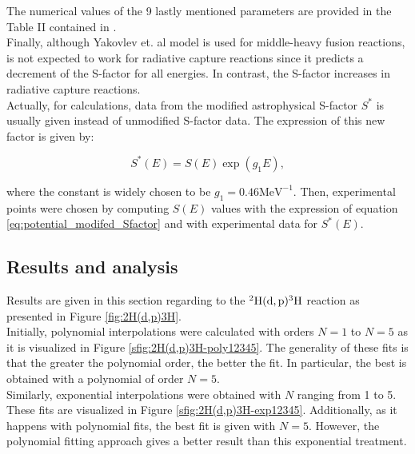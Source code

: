 \documentclass[openany]{book}
\begin{document}
The numerical values of the 9 lastly mentioned parameters are provided in the Table II contained in \cite{yakovlev_beard_gasques_wiescher_2010}. \\

Finally, although Yakovlev et. al model is used for middle-heavy fusion reactions, is not expected to work for radiative capture reactions since it predicts a decrement of the S-factor for all energies. In contrast, the S-factor increases in radiative capture reactions.  \\

Actually, for calculations, data from the modified astrophysical S-factor $S^{*}$ is usually given instead of unmodified S-factor data. The expression of this new factor is given by:

\begin{equation}\label{eq:potential_modifed_Sfactor}
	S^{*}(E) = S(E) \exp {(g_1E)},
\end{equation}

where the constant is widely chosen to be $g_1 = 0.46 \mathrm{MeV^{-1}}$. Then, experimental points were chosen by computing $S(E)$ values with the expression of equation \ref{eq:potential_modifed_Sfactor} and with experimental data for $S^{*}(E)$.


\subsection{Results and analysis} \label{sub:resultsAnalysisNonResonant}

Results are given in this section regarding to the $\mathrm{{}^{2}H(d, p){}^{3}H}$ reaction as presented in Figure \ref{fig:2H(d,p)3H}. \\ 

Initially, polynomial interpolations were calculated with orders $N = 1$ to $N = 5$ as it is visualized in Figure \ref{sfig:2H(d,p)3H-poly12345}. The generality of these fits is that the greater the polynomial order, the better the fit. In particular, the best is obtained with a polynomial of order $N = 5$.  \\

Similarly, exponential interpolations were obtained with $N$ ranging from 1 to 5. These fits are visualized in Figure \ref{sfig:2H(d,p)3H-exp12345}. Additionally, as it happens with polynomial fits, the best fit is given with $N = 5$. However, the polynomial fitting approach gives a better result than this exponential treatment. \\
\end{document}
